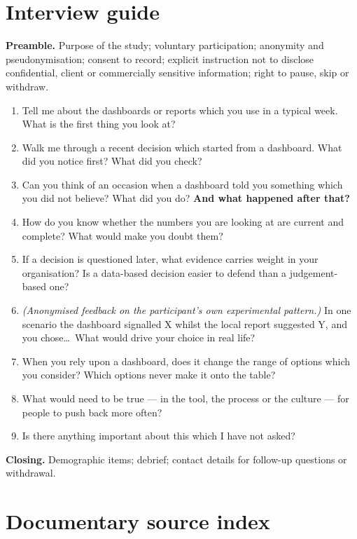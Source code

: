 \documentclass[11pt,a4paper]{article}
\numberwithin{figure}{section}
\numberwithin{table}{section}
\begin{document}
\section{Interview guide}

\textbf{Preamble.} Purpose of the study; voluntary participation; anonymity and pseudonymisation;
consent to record; explicit instruction not to disclose confidential, client or commercially
sensitive information; right to pause, skip or withdraw.

\begin{enumerate}[leftmargin=*,itemsep=2pt,topsep=4pt]
\item Tell me about the dashboards or reports which you use in a typical week. What is the first
thing you look at?
\item Walk me through a recent decision which started from a dashboard. What did you notice first?
What did you check?
\item Can you think of an occasion when a dashboard told you something which you did not believe?
What did you do? \textbf{And what happened after that?}
\item How do you know whether the numbers you are looking at are current and complete? What would
make you doubt them?
\item If a decision is questioned later, what evidence carries weight in your organisation? Is a
data-based decision easier to defend than a judgement-based one?
\item \emph{(Anonymised feedback on the participant's own experimental pattern.)} In one scenario
the dashboard signalled X whilst the local report suggested Y, and you chose\ldots\ What would drive
your choice in real life?
\item When you rely upon a dashboard, does it change the range of options which you consider? Which
options never make it onto the table?
\item What would need to be true --- in the tool, the process or the culture --- for people to push
back more often?
\item Is there anything important about this which I have not asked?
\end{enumerate}

\textbf{Closing.} Demographic items; debrief; contact details for follow-up questions or withdrawal.

\section{Documentary source index}
\end{document}
